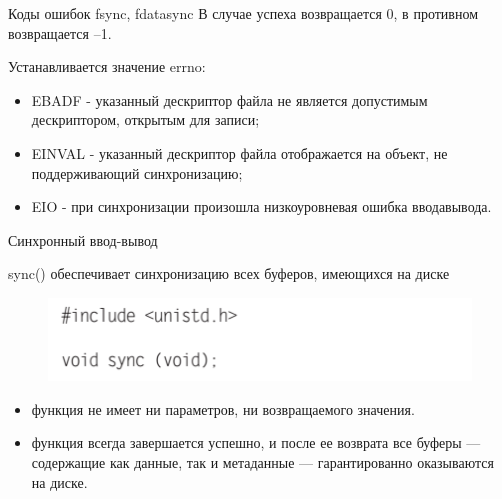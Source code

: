 \documentclass{beamer}
\begin{document}
\begin{frame}{Коды ошибок fsync, fdatasync}
В случае успеха возвращается 0, в противном возвращается –1.

Устанавливается значение errno:
\begin{itemize}
\item EBADF -  указанный дескриптор файла не является допустимым дескриптором, открытым для записи;
\item EINVAL - указанный дескриптор файла отображается на объект, не поддерживающий синхронизацию;
\item EIO - при синхронизации произошла низкоуровневая ошибка ввода­вывода.
\end{itemize}
\end{frame}

\begin{frame}{Синхронный ввод-вывод}
\begin{block}{sync()}
обеспечивает синхронизацию всех буферов, имеющихся на диске
\begin{figure}[h]
\centering
\includegraphics[scale=0.6]{images/lec06-pic15.png}
\end{figure}
\end{block}
\begin{itemize}
\item функция не имеет ни параметров, ни возвращаемого значения. 
\item функция всегда завершается успешно, и после ее возврата все буферы — содержащие как данные,
так и метаданные — гарантированно оказываются на диске.
\end{itemize}
\end{frame}
\end{document}
